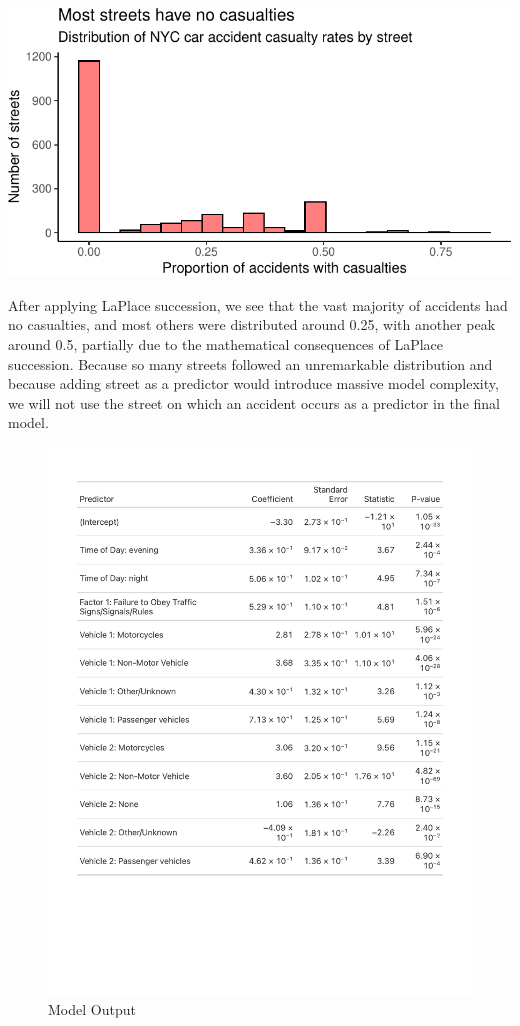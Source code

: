 \documentclass[
  letterpaper,
  DIV=11,
  numbers=noendperiod]{scrartcl}
\begin{document}
\includegraphics{project_files/figure-pdf/viz-streets-hist-1.pdf}

After applying LaPlace succession, we see that the vast majority of
accidents had no casualties, and most others were distributed around
0.25, with another peak around 0.5, partially due to the mathematical
consequences of LaPlace succession. Because so many streets followed an
unremarkable distribution and because adding street as a predictor would
introduce massive model complexity, we will not use the street on which
an accident occurs as a predictor in the final model.

\begin{figure}

{\centering \includegraphics{table1.pdf}

}

\caption{Model Output}

\end{figure}
\end{document}
